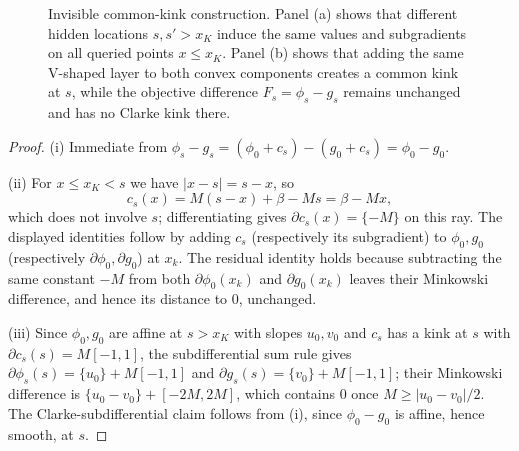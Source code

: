 \begin{figure}[t]
\vspace{0.4em}
\caption{
Invisible common-kink construction. Panel (a) shows that different hidden
locations \(s,s'>x_K\) induce the same values and subgradients on all queried
points \(x\le x_K\). Panel (b) shows that adding the same V-shaped layer to
both convex components creates a common kink at \(s\), while the objective
difference \(F_s=\phi_s-g_s\) remains unchanged and has no Clarke kink there.
}
\label{fig:invisible-common-kink}
\end{figure}

\begin{proof}
\textup{(i)} Immediate from $\phi_s-g_s=(\phi_0+c_s)-(g_0+c_s)=\phi_0-g_0$.

\textup{(ii)} For $x\le x_K<s$ we have $|x-s|=s-x$, so
\[
    c_s(x)=M(s-x)+\beta-Ms=\beta-Mx,
\]
which does not involve $s$; differentiating gives $\partial c_s(x)=\{-M\}$
on this ray. The displayed identities follow by adding $c_s$ (respectively
its subgradient) to $\phi_0,g_0$ (respectively $\partial\phi_0,\partial
g_0$) at $x_k$. The residual identity holds because subtracting the same
constant $-M$ from both $\partial\phi_0(x_k)$ and $\partial g_0(x_k)$
leaves their Minkowski difference, and hence its distance to $0$,
unchanged.

\textup{(iii)} Since $\phi_0,g_0$ are affine at $s>x_K$ with slopes
$u_0,v_0$ and $c_s$ has a kink at $s$ with $\partial c_s(s)=M[-1,1]$, the
subdifferential sum rule gives $\partial\phi_s(s)=\{u_0\}+M[-1,1]$ and
$\partial g_s(s)=\{v_0\}+M[-1,1]$; their Minkowski difference is
$\{u_0-v_0\}+[-2M,2M]$, which contains $0$ once $M\ge|u_0-v_0|/2$. The
Clarke-subdifferential claim follows from (i), since $\phi_0-g_0$ is
affine, hence smooth, at $s$.
\end{proof}

